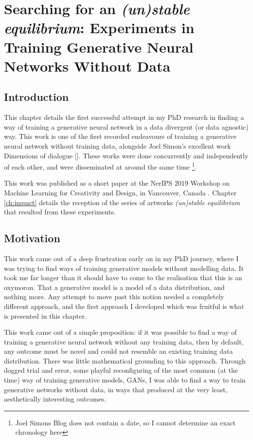 \chapter{Searching for an \textit{(un)stable equilibrium}:
Experiments in Training Generative Neural Networks Without Data}
\label{ch:unstable_eq}

\section{Introduction}

This chapter details the first successful attempt in my PhD research in finding a way of training a generative neural network in a data divergent (or data agnostic) way. 
This work is one of the first recorded endeavours of training a generative neural network without training data, alongside Joel Simon’s excellent work Dimensions of dialogue [\citeyear{simon2019dimensions}]. 
These works were done concurrently and independently of each other, and were disseminated at around the same time \footnote{Joel Simons Blog does not contain a date, so I cannot determine an exact chronology here}. 

This work was published as a short paper at the NerIPS 2019 Workshop on Machine Learning for Creativity and Design, in Vancouver, Canada \citep{broad2019searching}. 
Chapter \ref{ch:impact} details the reception of the series of artworks \textit{(un)stable equilibrium} that resulted from these experiments. 

\section{Motivation}

This work came out of a deep frustration early on in my PhD journey, where I was trying to find ways of training generative models without modelling data.
It took me far longer than it should have to come to the realisation that this is an oxymoron. 
That a generative model is a model of a data distribution, and nothing more. 
Any attempt to move past this notion needed a completely different approach, and the first approach I developed which was fruitful is what is presented in this chapter. 

This work came out of a simple proposition: if it was possible to find a way of training a generative neural network without any training data, then by default, any outcome must be novel and could not resemble an existing training data distribution. 
There was little mathematical grounding to this approach. 
Through dogged trial and error, some playful reconfiguring of the most common (at the time) way of training generative models, GANs, I was able to find a way to train generative networks without data, in ways that produced at the very least, aesthetically interesting outcomes. 

